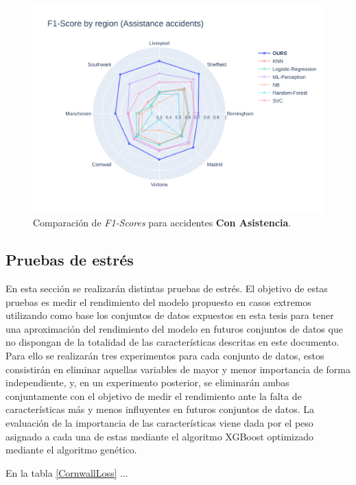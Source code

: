 \begin{figure}[H]
	\centering
	\includegraphics[width=150mm]{Figures/Assistance.png}
	\caption{Comparación de \textit{F1-Scores} para accidentes \textbf{Con Asistencia}.}    \label{GlobalAssistanceF1Score}
\end{figure}

\subsection{Pruebas de estrés}


En esta sección se realizarán distintas pruebas de estrés. El objetivo de estas pruebas es medir el rendimiento del modelo propuesto en casos extremos utilizando como base los conjuntos de datos expuestos en esta tesis para tener una aproximación del rendimiento del modelo en futuros conjuntos de datos que no dispongan de la totalidad de las características descritas en este documento. Para ello se realizarán tres experimentos para cada conjunto de datos, estos consistirán en eliminar aquellas variables de mayor y menor importancia de forma independiente, y, en un experimento posterior, se eliminarán ambas conjuntamente con el objetivo de medir el rendimiento ante la falta de características más y menos influyentes en futuros conjuntos de datos. La evaluación de la importancia de las características viene dada por el peso asignado a cada una de estas mediante el algoritmo XGBoost optimizado mediante el algoritmo genético.

En la tabla \ref{CornwallLoss} ...

